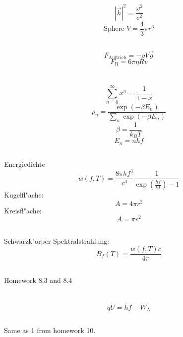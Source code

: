 \documentclass[12pt]{report}
\begin{document}
\subsection{}
\[|\vec{k}|^2=\frac{\omega^2}{c^2}\]
\[\textrm{Sphere }V=\frac{4}{3}\pi r^3\]

\subsection{} 
\[F_\mathrm{Auftrieb}=-\rho V\vec{g}\]
\[F_\mathrm{R}=6\pi\eta Rv\]


\section{}

\subsection{}
\[\sum_{n=0}^\infty x^n=\frac{1}{1-x}\]
\[p_n=\frac{\exp(-\beta E_n)}{\sum_n\exp(-\beta E_n)}\]
\[\beta=\frac{1}{k_BT}\]
\[E_n=nhf\]

\subsection{}

Energiedichte
\[w(f,T)=\frac{8\pi hf^3}{c^3}\frac{1}{\exp\left(\frac{hf}{kT}\right)-1}\]
Kugelfl"ache:
\[A=4\pi r^2\]
Kreisfl"ache:
\[A=\pi r^2\]

\subsection{}
Schwarzk"orper Spektralstrahlung:
\[B_f(T)=\frac{w(f,T)c}{4\pi}\]

\subsection{}
Homework 8.3 and 8.4

\section{}

\subsection{}
\[qU=hf-W_\mathrm{A}\]

\subsection{}
Same as 1 from homework 10.
\end{document}
